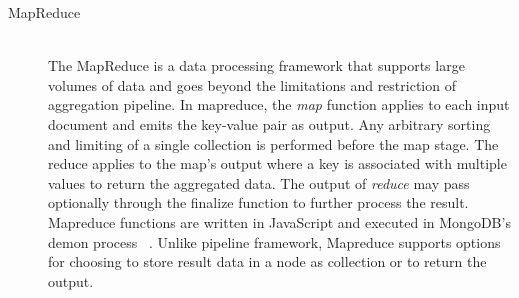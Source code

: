 \begin{description}
\item[MapReduce]  \hfill \\
		  The MapReduce is a data processing framework that supports large volumes of data and goes beyond the limitations and restriction of aggregation pipeline.  In mapreduce,  the \textit{map} function applies to each input document and emits the key-value pair as output. Any arbitrary sorting and limiting  of a single collection is performed before the map stage. The reduce applies to the map's output where a key is associated with multiple values to return the aggregated data. The output of \textit{reduce} may pass optionally through the finalize function to further process the result. Mapreduce functions are written in JavaScript and executed in MongoDB's demon process ~\cite{mongodbaggregation}.  Unlike pipeline framework, Mapreduce supports options for choosing to store result  data in a node as collection or to return the output.
		  
\end{description}

